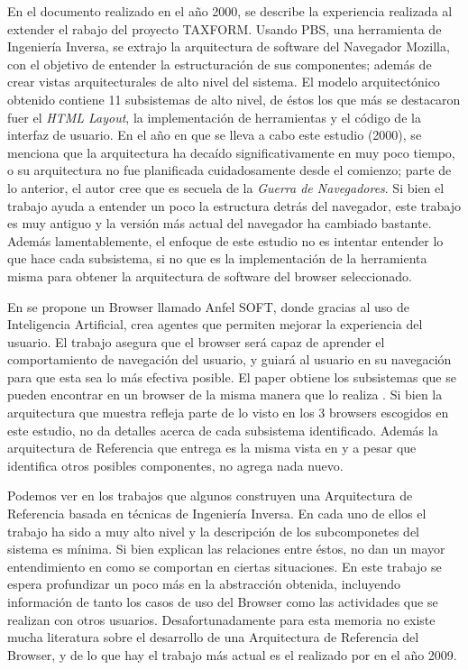 En el documento \cite{Godfrey2000} realizado en el año 2000, se describe la experiencia realizada al extender el rabajo del proyecto TAXFORM. Usando PBS, una herramienta de Ingeniería Inversa, se extrajo la arquitectura de software del Navegador Mozilla, con el objetivo de entender la estructuración de sus componentes; además de crear vistas arquitecturales de alto nivel del sistema. El modelo arquitectónico obtenido contiene 11 subsistemas de alto nivel, de éstos los que más se destacaron fuer el \textit{HTML Layout}, la implementación de herramientas y el código de la interfaz de usuario. En el año en que se lleva a cabo este estudio (2000), se menciona que la arquitectura ha decaído significativamente en muy poco tiempo, o su arquitectura no fue planificada cuidadosamente desde el comienzo; parte de lo anterior, el autor cree que es secuela de la \textit{Guerra de Navegadores}. Si bien el trabajo ayuda a entender un poco la estructura detrás del navegador, este trabajo es muy antiguo y la versión más actual del navegador ha cambiado bastante. Además lamentablemente, el enfoque de este estudio no es intentar entender lo que hace cada subsistema, si no que es la implementación de la herramienta misma para obtener la arquitectura de software del browser seleccionado.

En \cite{Lwin2009} se propone un Browser llamado Anfel SOFT, donde gracias al uso de Inteligencia Artificial, crea agentes que permiten mejorar la experiencia del usuario. El trabajo asegura que el browser será capaz de aprender el comportamiento de navegación del usuario, y guiará al usuario en su navegación para que esta sea lo más efectiva posible. El paper obtiene los subsistemas que se pueden encontrar en un browser de la misma manera que lo realiza \cite{2005-grosskurth-browser-refarch}. Si bien la arquitectura que muestra refleja parte de lo visto en los 3 browsers escogidos en este estudio, no da detalles acerca de cada subsistema identificado. Además la arquitectura de Referencia que entrega es la misma vista en \cite{2005-grosskurth-browser-refarch, preprint-grosskurth-browser-archevol} y a pesar que identifica otros posibles componentes, no agrega nada nuevo.

Podemos ver en los trabajos que algunos construyen una Arquitectura de Referencia basada en técnicas de Ingeniería Inversa. En cada uno de ellos el trabajo ha sido a muy alto nivel y la descripción de los subcomponetes del sistema es mínima. Si bien explican las relaciones entre éstos, no dan un mayor entendimiento en como se comportan en ciertas situaciones. En este trabajo se espera profundizar un poco más en la abstracción obtenida, incluyendo información de tanto los casos de uso del Browser como las actividades que se realizan con otros usuarios. Desafortunadamente para esta memoria no existe mucha literatura sobre el desarrollo de una Arquitectura de Referencia del Browser, y de lo que hay el trabajo más actual es el realizado por \cite{Lwin2009} en el año 2009.



